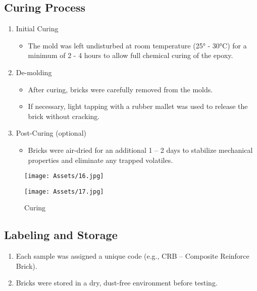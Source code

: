 \subsection{Curing Process  }
\begin{enumerate}
    \item  Initial Curing 
    \begin{itemize}
        \item  The mold was left undisturbed at room temperature (25° - 30°C) for a minimum of 2 - 4 hours to allow full chemical curing of the epoxy. 
    \end{itemize}
    \item  De-molding 
    \begin{itemize}
        \item After curing, bricks were carefully removed from the molds. 
        \item If necessary, light tapping with a rubber mallet was used to release the brick without cracking. 
    \end{itemize}
    \item Post-Curing (optional) 
    \begin{itemize}
        \item Bricks were air-dried for an additional 1 – 2 days to stabilize mechanical properties and eliminate any trapped volatiles.  
    \end{itemize}
\end{enumerate}

\begin{figure}[H]
    \centering
    \begin{minipage}{0.48\textwidth}
    \centering
    \texttt{[image: Assets/16.jpg]}
    \end{minipage}
    \hfill
    \begin{minipage}{0.48\textwidth}
    \centering
    \texttt{[image: Assets/17.jpg]}
    \end{minipage}
    \caption{Curing  }
\end{figure}

\subsection{Labeling and Storage }
\begin{enumerate}
    \item Each sample was assigned a unique code (e.g., CRB – Composite Reinforce Brick).
    \item Bricks were stored in a dry, dust-free environment before testing.
\end{enumerate}

